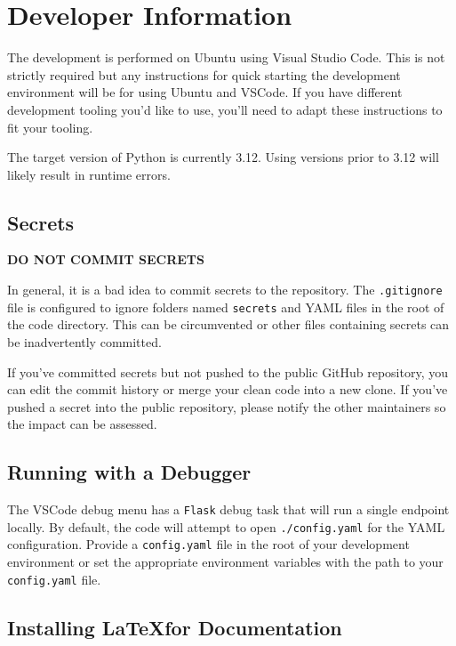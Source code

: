 \chapter{\cxoneflowtext\space Developer Information}\label{sec:cxoneflow-development}

The development is performed on Ubuntu using Visual Studio Code.  This is not 
strictly required but any instructions for quick starting the development environment 
will be for using Ubuntu and VSCode. If you have different development tooling you'd like
to use, you'll need to adapt these instructions to fit your tooling.

The target version of Python is currently 3.12.  Using versions prior to 3.12 will likely result in
runtime errors.

\section{Secrets}

\textbf{DO NOT COMMIT SECRETS}

In general, it is a bad idea to commit secrets to the repository.  The \texttt{.gitignore} file is configured
to ignore folders named \texttt{secrets} and YAML files in the root of the code directory.  This 
can be circumvented or other files containing secrets can be inadvertently committed.

If you've committed secrets but not pushed to the public GitHub repository, you can edit the commit history
or merge your clean code into a new clone.  If you've pushed a secret into the public repository, please notify
the other maintainers so the impact can be assessed.

\section{Running with a Debugger}

The VSCode debug menu has a \texttt{Flask} debug task that will run a single endpoint locally.  By default,
the code will attempt to open \texttt{./config.yaml} for the YAML configuration.  Provide a
\texttt{config.yaml} file in the root of your development environment or set the appropriate environment
variables with the path to your \texttt{config.yaml} file.


\section{Installing \LaTeX\space for Documentation}

